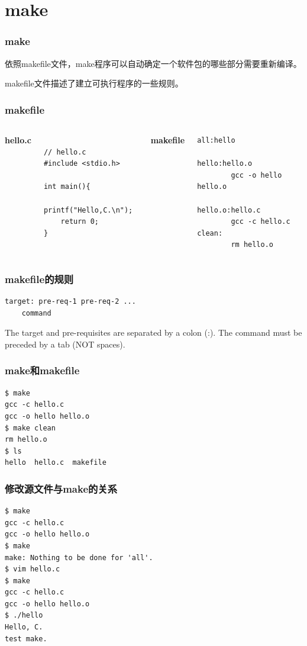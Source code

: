 \documentclass{beamer}
\begin{document}
\section{make}
\begin{frame}
\frametitle{make}
依照makefile文件，make程序可以自动确定一个软件包的哪些部分需要重新编译。

makefile文件描述了建立可执行程序的一些规则。
\end{frame}

\begin{frame}[fragile]
\frametitle{makefile}
\begin{columns}[c] %

\textbf{hello.c}
\lstset{language=C}
\begin{lstlisting}

// hello.c
#include <stdio.h>

int main(){
    printf("Hello,C.\n");
    return 0;
}

\end{lstlisting}
\textbf{makefile}
\begin{lstlisting}
all:hello

hello:hello.o
        gcc -o hello hello.o

hello.o:hello.c
        gcc -c hello.c
clean:
        rm hello.o
\end{lstlisting}

\end{columns}
\end{frame}
\begin{frame}[fragile]
\frametitle{makefile的规则}
\begin{lstlisting}
target: pre-req-1 pre-req-2 ...
	command
\end{lstlisting}
The target and pre-requisites are separated by a colon (:). The command must be preceded by a tab (NOT spaces).
\end{frame}
\begin{frame}[fragile]
\frametitle{make和makefile}
\begin{lstlisting}
$ make
gcc -c hello.c
gcc -o hello hello.o
$ make clean
rm hello.o
$ ls
hello  hello.c  makefile
\end{lstlisting}
\end{frame}

\begin{frame}[fragile]
\frametitle{修改源文件与make的关系}
\begin{lstlisting}
$ make
gcc -c hello.c
gcc -o hello hello.o
$ make
make: Nothing to be done for 'all'.
$ vim hello.c
$ make
gcc -c hello.c
gcc -o hello hello.o
$ ./hello
Hello, C.
test make.
\end{lstlisting}
\end{frame}
\end{document}
